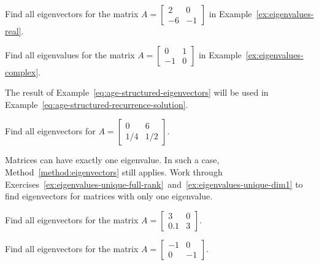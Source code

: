 \documentclass[../main.tex]{subfiles}
\begin{document}
\begin{example} \label{ex:eigenvectors-real}
  Find all eigenvectors for the matrix \(A = \begin{bmatrix} 2 & 0 \\ -6 & -1\end{bmatrix}\) in Example~\ref{ex:eigenvalues-real}.

  \blanks*
\end{example}
\clearpage

\begin{example} \label{ex:eigenvectors-complex}
  Find all eigenvalues for the matrix \(A = \begin{bmatrix} 0 & 1 \\ -1 & 0 \end{bmatrix}\) in Example~\ref{ex:eigenvalues-complex}.

  \blanks*
\end{example}
\clearpage

The result of Example~\ref{eq:age-structured-eigenvectors} will be used in Example~\ref{eq:age-structured-recurrence-solution}.
\begin{exercise} \label{eq:age-structured-eigenvectors}
  Find all eigenvectors for \(A = \begin{bmatrix} 0 & 6 \\ 1/4 & 1/2 \end{bmatrix}\).

  \blanks*
\end{exercise}
\clearpage

\faStar{} Matrices can have exactly one eigenvalue. In such a case, Method~\ref{method:eigenvectors} still applies. Work through Exercises~\ref{ex:eigenvalues-unique-full-rank}~and~\ref{ex:eigenvalues-unique-dim1} to find eigenvectors for matrices with only one eigenvalue.
\begin{exercise} \label{ex:eigenvalues-unique-full-rank}
  Find all eigenvectors for the matrix \(A = \begin{bmatrix} 3 & 0 \\ 0.1 & 3 \end{bmatrix}\).

\end{exercise}

\begin{exercise} \label{ex:eigenvalues-unique-dim1}
  Find all eigenvectors for the matrix \(A = \begin{bmatrix} -1 & 0 \\ 0 & -1 \end{bmatrix}\).

  \blanks*
\end{exercise}
\clearpage
\end{document}
